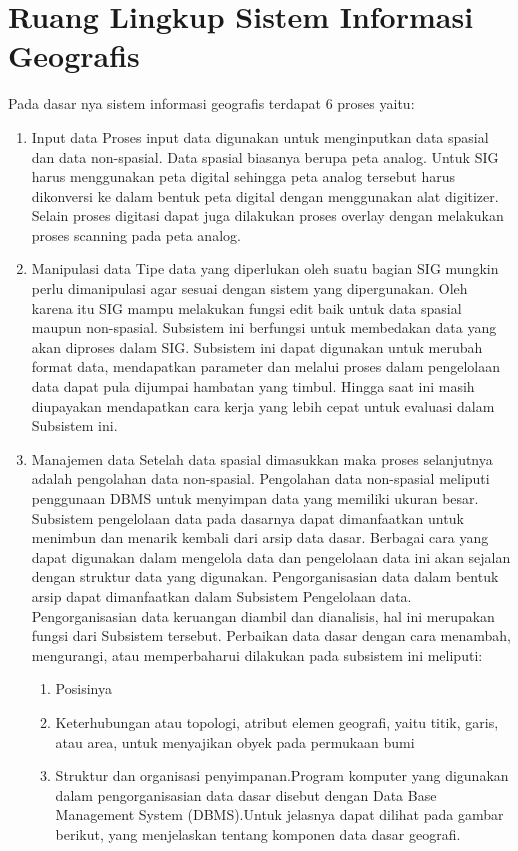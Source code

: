 \section{Ruang Lingkup Sistem Informasi Geografis}
Pada dasar nya sistem informasi geografis terdapat 6 proses yaitu:
\begin{enumerate}
\item Input data
\subitem Proses input data digunakan untuk menginputkan data spasial dan data non-spasial. Data spasial biasanya berupa peta analog. Untuk SIG harus menggunakan peta digital sehingga peta analog tersebut harus dikonversi ke dalam bentuk peta digital dengan menggunakan alat digitizer. Selain proses digitasi dapat juga dilakukan proses overlay dengan melakukan proses scanning pada peta analog.

\item Manipulasi data
\subitem Tipe data yang diperlukan oleh suatu bagian SIG mungkin perlu dimanipulasi agar sesuai dengan sistem yang dipergunakan. Oleh karena itu SIG mampu melakukan fungsi edit baik untuk data spasial maupun non-spasial.
Subsistem ini berfungsi untuk membedakan data yang akan diproses dalam SIG. Subsistem ini dapat digunakan untuk merubah format data, mendapatkan parameter dan melalui proses dalam pengelolaan data dapat pula dijumpai hambatan yang timbul. Hingga saat ini masih diupayakan mendapatkan cara kerja yang lebih cepat untuk evaluasi dalam Subsistem ini.

\item Manajemen data
\subitem Setelah data spasial dimasukkan maka proses selanjutnya adalah pengolahan data non-spasial. Pengolahan data non-spasial meliputi penggunaan DBMS untuk menyimpan data yang memiliki ukuran besar.
Subsistem pengelolaan data pada dasarnya dapat dimanfaatkan untuk menimbun dan menarik kembali dari arsip data dasar. Berbagai cara yang dapat digunakan dalam mengelola data dan pengelolaan data ini akan sejalan dengan struktur data yang digunakan. Pengorganisasian data dalam bentuk arsip dapat dimanfaatkan dalam Subsistem Pengelolaan data. Pengorganisasian data keruangan diambil dan dianalisis, hal ini merupakan fungsi dari Subsistem tersebut. Perbaikan data dasar dengan cara menambah, mengurangi, atau memperbaharui dilakukan pada subsistem ini meliputi:
\begin{enumerate}
\item Posisinya
\item Keterhubungan atau topologi, atribut elemen geografi, yaitu titik, garis, atau area, untuk menyajikan obyek pada permukaan bumi
\item Struktur dan organisasi penyimpanan.Program komputer yang digunakan dalam pengorganisasian data dasar disebut dengan Data Base Management System (DBMS).Untuk jelasnya dapat dilihat pada gambar berikut, yang menjelaskan tentang komponen data dasar geografi.
\end{enumerate}


\end{enumerate}
